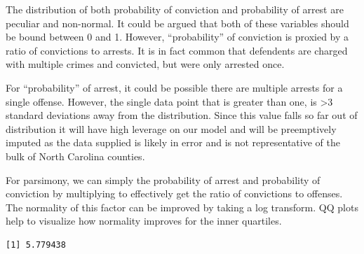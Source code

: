 \documentclass[]{article}
\newenvironment{Shaded}{}{}
\newcommand{\CommentTok}[1]{\textcolor[rgb]{0.00,0.50,0.00}{#1}}
\newcommand{\DataTypeTok}[1]{#1}
\newcommand{\DecValTok}[1]{#1}
\newcommand{\KeywordTok}[1]{\textcolor[rgb]{0.00,0.00,1.00}{#1}}
\newcommand{\NormalTok}[1]{#1}
\newcommand{\OperatorTok}[1]{#1}
\newcommand{\StringTok}[1]{\textcolor[rgb]{0.00,0.50,0.50}{#1}}
\begin{document}
The distribution of both probability of conviction and probability of
arrest are peculiar and non-normal. It could be argued that both of
these variables should be bound between 0 and 1. However,
``probability'' of conviction is proxied by a ratio of convictions to
arrests. It is in fact common that defendents are charged with multiple
crimes and convicted, but were only arrested once.

For ``probability'' of arrest, it could be possible there are multiple
arrests for a single offense. However, the single data point that is
greater than one, is \textgreater{}3 standard deviations away from the
distribution. Since this value falls so far out of distribution it will
have high leverage on our model and will be preemptively imputed as the
data supplied is likely in error and is not representative of the bulk
of North Carolina counties.

For parsimony, we can simply the probability of arrest and probability
of conviction by multiplying to effectively get the ratio of convictions
to offenses. The normality of this factor can be improved by taking a
log transform. QQ plots help to visualize how normality improves for the
inner quartiles.

\begin{Shaded}
\end{Shaded}

\begin{verbatim}
[1] 5.779438
\end{verbatim}

\begin{Shaded}
\end{Shaded}
\end{document}
